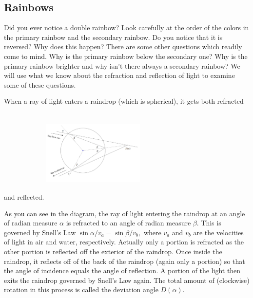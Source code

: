 





\subsection{Rainbows}
Did you ever notice a double rainbow?  
\InsertGraphic{} 
Look carefully at the order of the colors in the primary rainbow and
the secondary rainbow.  Do you notice that it is reversed?  Why does
this happen?  There are some other questions which readily come to
mind.  Why is the primary rainbow below the secondary one?  Why is the
primary rainbow brighter and why isn’t there always a secondary
rainbow?  We will use what we know about the refraction and reflection
of light to examine some of these questions.

When a ray of light enters a raindrop (which is spherical), it gets
both refracted and reflected.
\includegraphics*[height=2in,width=2in]{Figures/Rainbow1}

As you can see in the diagram, the ray of light entering the raindrop
at an angle of radian measure $\alpha$ is refracted to an angle of radian
measure $\beta.$  This is governed by Snell’s Law $\sin\alpha/v_a =\sin\beta/v_b,$
where $v_a$ and $v_b$ are the velocities of light in air and water,
respectively.  Actually only a portion is refracted as the other
portion is reflected off the exterior of the raindrop.  Once inside
the raindrop, it reflects off of the back of the raindrop (again only
a portion) so that the angle of incidence equals the angle of
reflection.  A portion of the light then exits the raindrop governed
by Snell’s Law again.  The total amount of (clockwise) rotation in
this process is called the deviation angle $D(\alpha).$

